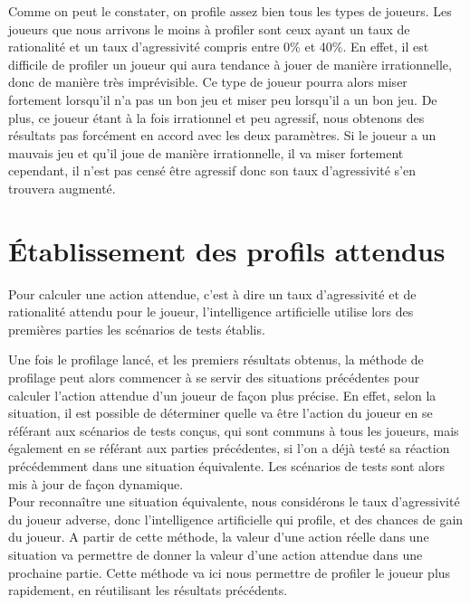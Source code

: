 \documentclass{report}
\begin{document}
Comme on peut le constater, on profile assez bien tous les types de joueurs. Les joueurs que nous arrivons le moins à profiler sont ceux ayant un taux de rationalité et un taux d'agressivité compris entre 0\% et 40\%. En effet, il est difficile de profiler un joueur qui aura tendance à jouer de manière irrationnelle, donc de manière très imprévisible. Ce type de joueur pourra alors miser fortement lorsqu'il n'a pas un bon jeu et miser peu lorsqu'il a un bon jeu. De plus, ce joueur étant à la fois irrationnel et peu agressif, nous obtenons des résultats pas forcément en accord avec les deux paramètres. Si le joueur a un mauvais jeu et qu'il joue de manière irrationnelle, il va miser fortement cependant, il n'est pas censé être agressif donc son taux d'agressivité s'en trouvera augmenté.\par


\section{Établissement des profils attendus}

\hspace{0.5cm}Pour calculer une action attendue, c'est à dire un taux d'agressivité et de rationalité attendu pour le joueur, l'intelligence artificielle utilise lors des premières parties les scénarios de tests établis.\par
Une fois le profilage lancé, et les premiers résultats obtenus, la méthode de profilage peut alors commencer à se servir des situations précédentes pour calculer l'action attendue d'un joueur de façon plus précise. En effet, selon la situation, il est possible de déterminer quelle va être l'action du joueur en se référant aux scénarios de tests conçus, qui sont communs à tous les joueurs, mais également en se référant aux parties précédentes, si l'on a déjà testé sa réaction précédemment dans une situation équivalente. Les scénarios de tests sont alors mis à jour de façon dynamique.\\

Pour reconnaître une situation équivalente, nous considérons le taux d'agressivité du joueur adverse, donc l'intelligence artificielle qui profile, et des chances de gain du joueur. A partir de cette méthode, la valeur d'une action réelle dans une situation va permettre de donner la valeur d'une action attendue dans une prochaine partie. Cette méthode va ici nous permettre de profiler le joueur plus rapidement, en réutilisant les résultats précédents.\\
\end{document}
